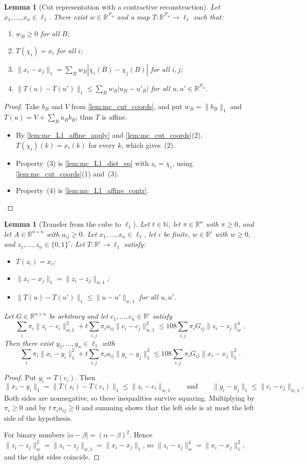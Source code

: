 \documentclass[11pt]{article}
\newtheorem{lemma}[theorem]{Lemma}
\theoremstyle{definition}
\theoremstyle{remark}
\newcommand{\R}{\mathbb{R}}
\newcommand{\N}{\mathbb{N}}
\newcommand{\Pn}{\mathcal{P}_n}
\newcommand{\wn}[1]{\lVert #1\rVert_{w,1}}
\newcommand{\hn}[1]{\lVert #1\rVert_{w}}
\newcommand{\lnorm}[1]{\lVert #1\rVert_{1}}
\begin{document}
\begin{lemma}[Cut representation with a contractive reconstruction]\label{lem:mc_cut_L1}
Let $x_1,\dots,x_n\in\ell_1$. There exist $w\in\R^{\Pn}$ and a map $T:\R^{\Pn}\to\ell_1$ such that:
\begin{enumerate}
\item $w_B\ge0$ for all $B$;
\item $T(\chi_i)=x_i$ for all $i$;
\item $\lnorm{x_i-x_j}=\sum_Bw_B|\chi_i(B)-\chi_j(B)|$ for all $i,j$;
\item $\lnorm{T(u)-T(u')}\le\sum_Bw_B|u_B-u'_B|$ for all $u,u'\in\R^{\Pn}$.
\end{enumerate}
\end{lemma}
\begin{proof}
Take $b_B$ and $V$ from \cref{lem:mc_cut_coords}, and put $w_B=\lnorm{b_B}$ and $T(u)=V+\sum_Bu_Bb_B$; thus $T$ is affine.
\begin{itemize}
\item By \cref{lem:mc_L1_affine_apply} and \cref{lem:mc_cut_coords}(2), $T(\chi_i)(k)=x_i(k)$ for every $k$, which gives~(2).
\item Property~(3) is \cref{lem:mc_L1_dist_eq} with $z_i=\chi_i$, using \cref{lem:mc_cut_coords}(1) and~(3).
\item Property~(4) is \cref{lem:mc_L1_affine_contr}. \qedhere
\end{itemize}
\end{proof}

\begin{lemma}[Transfer from the cube to $\ell_1$]\label{lem:mc_transfer}
Let $t\in\N$, let $\pi\in\R^n$ with $\pi\ge0$, and let $A\in\R^{n\times n}$ with $a_{ij}\ge0$. Let $x_1,\dots,x_n\in\ell_1$, let $\iota$ be finite, $w\in\R^\iota$ with $w\ge0$, and $z_1,\dots,z_n\in\{0,1\}^\iota$. Let $T:\R^\iota\to\ell_1$ satisfy:
\begin{itemize}
\item $T(z_i)=x_i$;
\item $\lnorm{x_i-x_j}=\wn{z_i-z_j}$;
\item $\lnorm{T(u)-T(u')}\le\wn{u-u'}$ for all $u,u'$.
\end{itemize}
Let $G\in\R^{n\times n}$ be arbitrary and let $c_1,\dots,c_n\in\R^\iota$ satisfy
\[
\sum_i\pi_i\wn{z_i-c_i}^2+t\sum_{i,j}\pi_ia_{ij}\wn{c_i-c_j}^2\le108\sum_{i,j}\pi_iG_{ij}\hn{z_i-z_j}^4 .
\]
Then there exist $y_1,\dots,y_n\in\ell_1$ with
\[
\sum_i\pi_i\lnorm{x_i-y_i}^2+t\sum_{i,j}\pi_ia_{ij}\lnorm{y_i-y_j}^2\le108\sum_{i,j}\pi_iG_{ij}\lnorm{x_i-x_j}^2 .
\]
\end{lemma}
\begin{proof}
Put $y_i=T(c_i)$. Then
\[
\lnorm{x_i-y_i}=\lnorm{T(z_i)-T(c_i)}\le\wn{z_i-c_i}\qquad\text{and}\qquad\lnorm{y_i-y_j}\le\wn{c_i-c_j}.
\]
Both sides are nonnegative, so these inequalities survive squaring. Multiplying by $\pi_i\ge0$ and by $t\,\pi_ia_{ij}\ge0$ and summing shows that the left side is at most the left side of the hypothesis.

For binary numbers $|\alpha-\beta|=(\alpha-\beta)^2$. Hence $\hn{z_i-z_j}^2=\wn{z_i-z_j}=\lnorm{x_i-x_j}$, so $\hn{z_i-z_j}^4=\lnorm{x_i-x_j}^2$, and the right sides coincide.
\end{proof}
\end{document}
